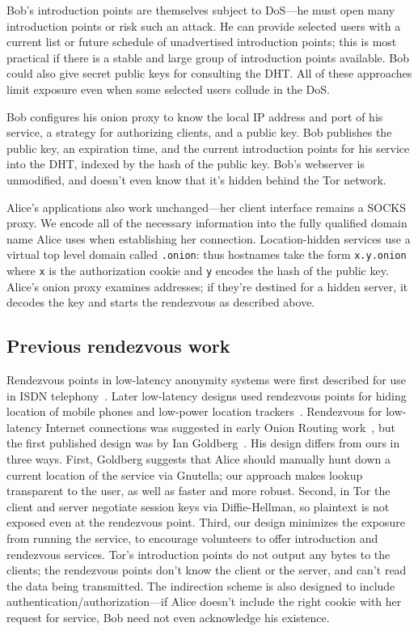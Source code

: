 \documentclass[times,10pt,twocolumn]{article}
\begin{document}
Bob's introduction points are themselves subject to DoS---he must
open many introduction points or risk such an attack.
He can provide selected users with a current list or future schedule of
unadvertised introduction points;
this is most practical
if there is a stable and large group of introduction points
available. Bob could also give secret public keys
for consulting the DHT\@. All of these approaches
limit exposure even when
some selected users collude in the DoS\@.


Bob configures his onion proxy to know the local IP address and port of his
service, a strategy for authorizing clients, and a public key. Bob
publishes the public key, an expiration time, and
the current introduction points for his service into the DHT, indexed
by the hash of the public key.  Bob's webserver is unmodified,
and doesn't even know that it's hidden behind the Tor network.

Alice's applications also work unchanged---her client interface
remains a SOCKS proxy. We encode all of the necessary information
into the fully qualified domain name Alice uses when establishing her
connection. Location-hidden services use a virtual top level domain
called {\tt .onion}: thus hostnames take the form {\tt x.y.onion} where
{\tt x} is the authorization cookie and {\tt y} encodes the hash of
the public key. Alice's onion proxy
examines addresses; if they're destined for a hidden server, it decodes
the key and starts the rendezvous as described above.

\subsection{Previous rendezvous work}

Rendezvous points in low-latency anonymity systems were first
described for use in ISDN telephony~\cite{jerichow-jsac98,isdn-mixes}.
Later low-latency designs used rendezvous points for hiding location
of mobile phones and low-power location
trackers~\cite{federrath-ih96,reed-protocols97}.  Rendezvous for
low-latency
Internet connections was suggested in early Onion Routing
work~\cite{or-ih96}, but the first published design was by Ian
Goldberg~\cite{ian-thesis}. His design differs from
ours in three ways. First, Goldberg suggests that Alice should manually
hunt down a current location of the service via Gnutella; our approach
makes lookup transparent to the user, as well as faster and more robust.
Second, in Tor the client and server negotiate session keys
via Diffie-Hellman, so plaintext is not exposed even at the rendezvous point. Third,
our design minimizes the exposure from running the
service, to encourage volunteers to offer introduction and rendezvous
services. Tor's introduction points do not output any bytes to the
clients; the rendezvous points don't know the client or the server,
and can't read the data being transmitted. The indirection scheme is
also designed to include authentication/authorization---if Alice doesn't
include the right cookie with her request for service, Bob need not even
acknowledge his existence.
\end{document}

